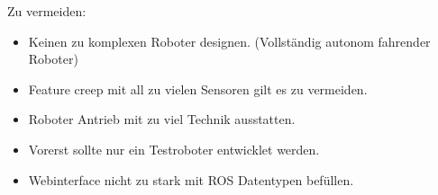 \begin{flushleft}
    Zu vermeiden:
    \begin{itemize}
    \item Keinen zu komplexen Roboter designen. (Vollständig autonom fahrender Roboter)
    \item Feature creep mit all zu vielen Sensoren gilt es zu vermeiden.
    \item Roboter Antrieb mit zu viel Technik ausstatten.
    \item Vorerst sollte nur ein Testroboter entwicklet werden.
    \item Webinterface nicht zu stark mit ROS Datentypen befüllen.
    \end {itemize}
    
\end{flushleft}
